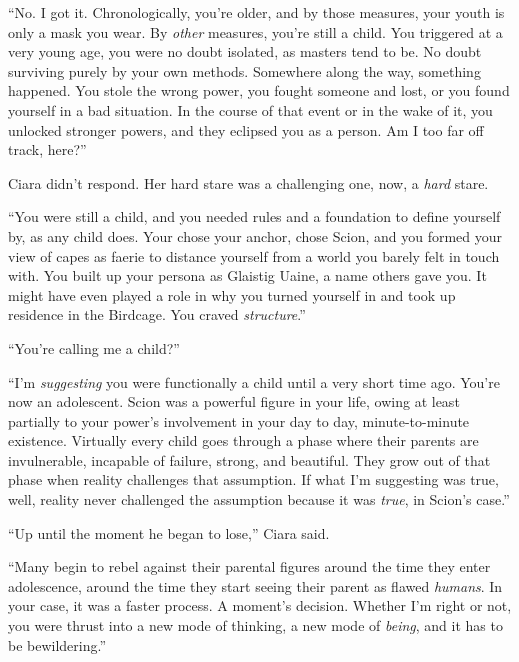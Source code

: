 ``No.  I got it.  Chronologically, you're older, and by those measures, your youth is only a mask you wear.  By \emph{other} measures, you're still a child.  You triggered at a very young age, you were no doubt isolated, as masters tend to be.  No doubt surviving purely by your own methods.  Somewhere along the way, something happened.  You stole the wrong power, you fought someone and lost, or you found yourself in a bad situation.  In the course of that event or in the wake of it, you unlocked stronger powers, and they eclipsed you as a person.  Am I too far off track, here?''



Ciara didn't respond.  Her hard stare was a challenging one, now, a \emph{hard }stare.



``You were still a child, and you needed rules and a foundation to define yourself by, as any child does.  Your chose your anchor, chose Scion, and you formed your view of capes as faerie to distance yourself from a world you barely felt in touch with.  You built up your persona as Glaistig Uaine, a name others gave you.  It might have even played a role in why you turned yourself in and took up residence in the Birdcage.  You craved \emph{structure}.''



``You're calling me a child?''



``I'm \emph{suggesting }you were functionally a child until a very short time ago.  You're now an adolescent.  Scion was a powerful figure in your life, owing at least partially to your power's involvement in your day to day, minute-to-minute existence.  Virtually every child goes through a phase where their parents are invulnerable, incapable of failure, strong, and beautiful.  They grow out of that phase when reality challenges that assumption.  If what I'm suggesting was true, well, reality never challenged the assumption because it was \emph{true}, in Scion's case.''



``Up until the moment he began to lose,'' Ciara said.



``Many begin to rebel against their parental figures around the time they enter adolescence, around the time they start seeing their parent as flawed \emph{humans}.  In your case, it was a faster process.  A moment's decision.  Whether I'm right or not, you were thrust into a new mode of thinking, a new mode of \emph{being}, and it has to be bewildering.''



